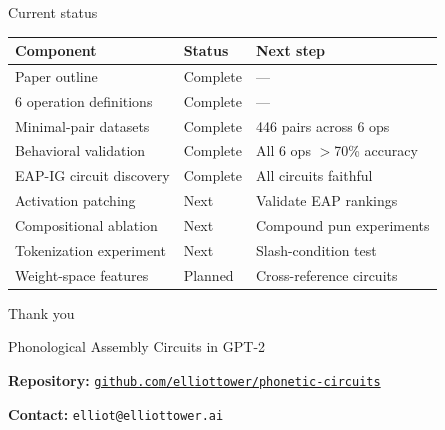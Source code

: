 \documentclass[10pt,aspectratio=169]{beamer}
\begin{document}
\begin{frame}{Current status}

\begin{center}
\small
\begin{tabular}{lll}
\toprule
\textbf{Component} & \textbf{Status} & \textbf{Next step} \\
\midrule
Paper outline & \textcolor{circuit}{Complete} & --- \\
6 operation definitions & \textcolor{circuit}{Complete} & --- \\
Minimal-pair datasets & \textcolor{circuit}{Complete} & 446 pairs across 6 ops \\
Behavioral validation & \textcolor{circuit}{Complete} & All 6 ops $>$70\% accuracy \\
EAP-IG circuit discovery & \textcolor{circuit}{Complete} & All circuits faithful \\
\midrule
Activation patching & \textcolor{backbone}{Next} & Validate EAP rankings \\
Compositional ablation & \textcolor{backbone}{Next} & Compound pun experiments \\
Tokenization experiment & \textcolor{backbone}{Next} & Slash-condition test \\
Weight-space features & Planned & Cross-reference circuits \\
\bottomrule
\end{tabular}
\end{center}

\end{frame}

\begin{frame}{Thank you}

\begin{center}
\vfill
{\Large Phonological Assembly Circuits in GPT-2}

\vspace{1.5em}

\textbf{Repository:} \href{https://github.com/elliottower/phonetic-circuits}{\texttt{github.com/elliottower/phonetic-circuits}}

\textbf{Contact:} \texttt{elliot@elliottower.ai}

\vspace{1.5em}

\vfill
\end{center}
\end{frame}
\end{document}
